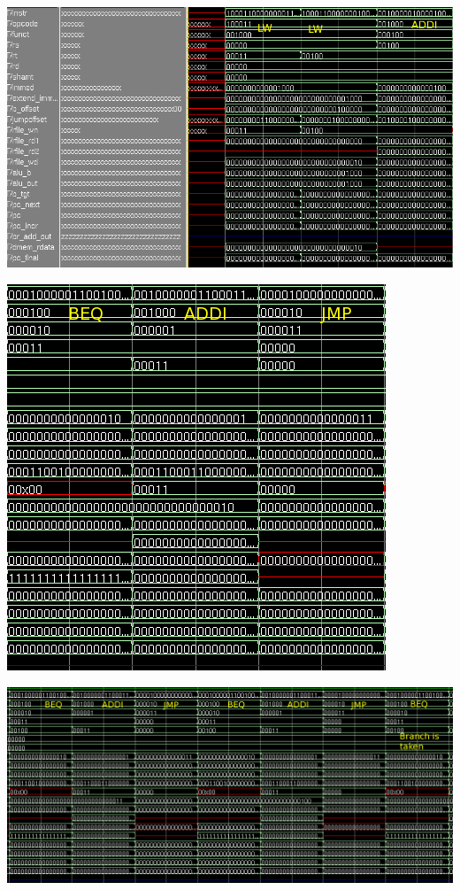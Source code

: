 \documentclass[12pt]{article}
\begin{document}
    \centerline{\includegraphics[scale=0.55]{img/test_program_wave_part1_1.png}}
    \centerline{\includegraphics[scale=0.55]{img/test_program_wave_part1_2.png}}

    \centerline{\includegraphics[scale=0.55]{img/test_program_wave_part2.png}}
\end{document}
